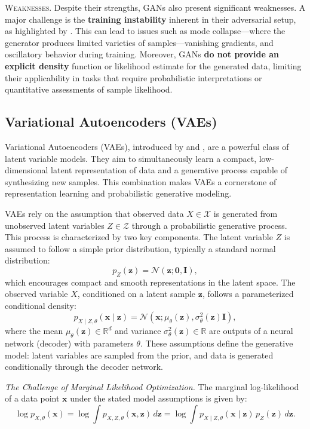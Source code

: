 \textsc{Weaknesses.} Despite their strengths, GANs also present significant weaknesses. A major challenge is the \textbf{training instability} inherent in their adversarial setup, as highlighted by \citet{salimans2016improved}. This can lead to issues such as mode collapse—where the generator produces limited varieties of samples—vanishing gradients, and oscillatory behavior during training. Moreover, GANs \textbf{do not provide an explicit density} function or likelihood estimate for the generated data, limiting their applicability in tasks that require probabilistic interpretations or quantitative assessments of sample likelihood.

\subsection{Variational Autoencoders (VAEs)}\label{sec:vae}

Variational Autoencoders (VAEs), introduced by \citet{kingma2013auto} and \citet{rezende2014stochastic}, are a powerful class of latent variable models. They aim to simultaneously learn a compact, low-dimensional latent representation of data and a generative process capable of synthesizing new samples. This combination makes VAEs a cornerstone of representation learning and probabilistic generative modeling.

VAEs rely on the assumption that observed data \(X \in \mathcal{X}\) is generated from unobserved latent variables \(Z \in \mathcal{Z}\) through a probabilistic generative process. This process is characterized by two key components. The latent variable \(Z\) is assumed to follow a simple prior distribution, typically a standard normal distribution:
\[
p_{Z}(\mathbf{z}) = \mathcal{N}(\mathbf{z}; \mathbf{0}, \mathbf{I}),
\]
which encourages compact and smooth representations in the latent space. The observed variable \(X\), conditioned on a latent sample \(\mathbf{z}\), follows a parameterized conditional density:
\[
p_{X \mid Z, \theta}(\mathbf{x} \mid \mathbf{z}) = \mathcal{N}(\mathbf{x}; \mu_\theta(\mathbf{z}), \sigma_\theta^2(\mathbf{z}) \mathbf{I}),
\]
where the mean \(\mu_\theta(\mathbf{z}) \in \mathbb{R}^d\) and variance \(\sigma_\theta^2(\mathbf{z}) \in \mathbb{R}\) are outputs of a neural network (decoder) with parameters \(\theta\). These assumptions define the generative model: latent variables are sampled from the prior, and data is generated conditionally through the decoder network.

\textit{The Challenge of Marginal Likelihood Optimization.}  
The marginal log-likelihood of a data point \(\mathbf{x}\) under the stated model assumptions is given by:
\[
\log p_{X, \theta}(\mathbf{x}) = \log \int p_{X, Z, \theta}(\mathbf{x}, \mathbf{z}) \, d\mathbf{z} = \log \int p_{X \mid Z, \theta}(\mathbf{x} \mid \mathbf{z}) \, p_{Z}(\mathbf{z}) \, d\mathbf{z}.
\]

